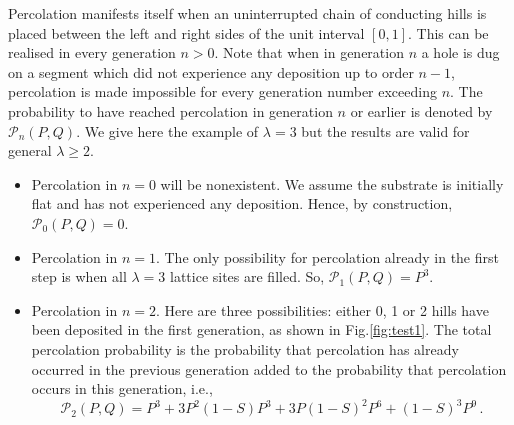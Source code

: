 \documentclass[amsmath,amssymb,amsfonts,aps,pre,preprint,superscriptaddress,bibnotes,showpacs,showkeys,longbibliography,nofootinbib]{revtex4-1}
\begin{document}
Percolation manifests itself when an uninterrupted chain of conducting hills is placed between the left and right sides of the unit interval $[0, 1]$. This can be realised in every generation $n>0$. Note that when in generation $n$ a hole is dug on a segment which did not experience any deposition up to order $n-1$, percolation is made impossible for every generation number exceeding $ n$. The probability to have reached percolation in generation $n$ or earlier is denoted by $\mathcal{P}_n(P,Q)$. We give here the example of $\lambda = 3$ but the results are valid for general $\lambda\geq2$.
\begin{itemize}
    \item Percolation in $n=0$ will be nonexistent. We assume the substrate is initially flat and has not experienced any deposition. Hence, by construction, $\mathcal{P}_0(P,Q)=0$.
    \item Percolation in $n = 1$. The only possibility for percolation already in the first step is when all $\lambda =3$ lattice sites are filled. So, $\mathcal{P}_1(P,Q) = P^3$.
    \item Percolation in $n=2$. Here are three possibilities: either 0, 1 or 2 hills have been deposited in the first generation, as shown in Fig.\ref{fig:test1}. The total percolation probability is the probability that percolation has already occurred in the previous generation added to the probability that percolation occurs in this generation, i.e.,
    \begin{equation}
        \mathcal{P}_2(P,Q) = P^3 + 3P^2 (1-S) P^3 + 3P (1-S)^2 P^6 + (1-S)^3 P^9\, .
    \end{equation}


\end{itemize}
\end{document}
